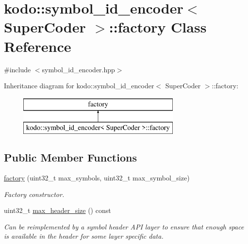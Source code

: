 \hypertarget{classkodo_1_1symbol__id__encoder_1_1factory}{\section{kodo\-:\-:symbol\-\_\-id\-\_\-encoder$<$ Super\-Coder $>$\-:\-:factory Class Reference}
\label{classkodo_1_1symbol__id__encoder_1_1factory}
}


{\ttfamily \#include $<$symbol\-\_\-id\-\_\-encoder.\-hpp$>$}

Inheritance diagram for kodo\-:\-:symbol\-\_\-id\-\_\-encoder$<$ Super\-Coder $>$\-:\-:factory\-:\begin{figure}[H]
\begin{center}
\leavevmode
\includegraphics[height=2.000000cm]{classkodo_1_1symbol__id__encoder_1_1factory}
\end{center}
\end{figure}
\subsection*{Public Member Functions}
\begin{DoxyCompactItemize}
\item 
\hyperlink{classkodo_1_1symbol__id__encoder_1_1factory_a24e6528162b7d6f2b0d58eb6147019d7}{factory} (uint32\-\_\-t max\-\_\-symbols, uint32\-\_\-t max\-\_\-symbol\-\_\-size)
\begin{DoxyCompactList}\small\item\em Factory constructor. \end{DoxyCompactList}\item 
uint32\-\_\-t \hyperlink{classkodo_1_1symbol__id__encoder_1_1factory_a50fe82465f466050a28e1b6ba465f92b}{max\-\_\-header\-\_\-size} () const 
\begin{DoxyCompactList}\small\item\em Can be reimplemented by a symbol header A\-P\-I layer to ensure that enough space is available in the header for some layer specific data. \end{DoxyCompactList}\end{DoxyCompactItemize}


